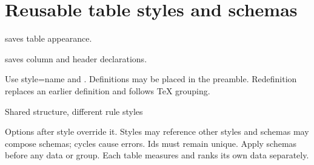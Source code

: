 \section{Reusable table styles and schemas}
 saves table appearance.

 saves column and header declarations.

Use style=name and . Definitions may be placed in the
preamble. Redefinition replaces an earlier definition and follows TeX grouping.
\begin{demo}{Shared structure, different rule styles}
\begin{center}
\begin{gradtable}[align=c,header align=c,style=benchmark]
\end{gradtable}
\end{center}

\begin{center}
\begin{gradtable}[align=c,header align=c,style=benchmark,rules=grid]
\end{gradtable}
\end{center}
\end{demo}
Options after style override it. Styles may reference other styles and schemas
may compose schemas; cycles cause errors. Ids must remain unique. Apply schemas
before any data or group. Each table measures and ranks its own data separately.
